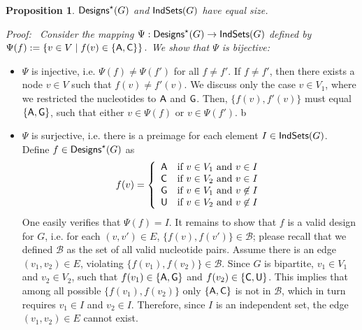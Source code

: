 \documentclass{bmcart}
\newtheorem{proposition}[theorem]{Proposition}
\newenvironment{proof}[1][]{\noindent \em Proof\ifthenelse{\equal{#1}{}}{}{ (#1)}:~}{}
\newcommand{\B}{\mathcal{B}}
\newcommand{\Design}[1]{{\sf Designs}^{\star}(#1)}
\newcommand{\IS}[1]{{\sf IndSets}(#1)}
\newcommand{\Nuc}[1]{{\sf #1}}
\newcommand{\Ab}{\Nuc{A}}
\newcommand{\Cb}{\Nuc{C}}
\newcommand{\Gb}{\Nuc{G}}
\newcommand{\Ub}{\Nuc{U}}
\begin{document}
\begin{proposition}
  $\Design{G}$ and $\IS{G}$ have equal size.
\end{proposition}
%
\begin{proof}
Consider the mapping $\Psi: \Design{G} \to \IS{G}$ defined by $ \Psi(f) := \left\{v\in V\mid f(v)\in\{\Ab,\Cb\}\right\}.$
We show that $\Psi$ is bijective:%
\begin{itemize}
\item $\Psi$ is injective, i.e. $\Psi(f)\neq\Psi(f')$ for all $f\neq f'$.
If $f\neq f'$, then there exists a node $v\in V$ such that $f(v)\neq f'(v)$.
We discuss only the case $v\in V_1$, where we restricted the nucleotides to $\Ab$ and $\Gb$. Then, $\{f(v),f'(v)\}$ must equal $\{\Ab,\Gb\}$, such that either $v\in\Psi(f)$ or $v\in\Psi(f')$.
%
b\item $\Psi$ is surjective, i.e. there is a preimage for each element $I\in \IS{G}$. Define $f\in\Design{G}$ as\begin{displaymath}
f(v) = \left\{\begin{array}{ll} %
\Ab{} & \text{if $v\in V_1$ and $v\in I$} \\ %
\Cb{} & \text{if $v\in V_2$ and $v\in I$} \\
\Gb{} & \text{if $v\in V_1$ and $v\not\in I$} \\ %
\Ub{} & \text{if $v\in V_2$ and $v\not\in I$}
\end{array}\right.
\end{displaymath}
One easily verifies that $\Psi(f) = I$.
%
%
It remains to show that $f$ is a valid design for $G$, i.e. for each $(v, v') \in E$, $\{f(v),f(v')\}\in \B$; please recall that we defined $\B$ as the set of all valid nucleotide pairs.
Assume there is an edge $(v_1,v_2)\in E$, violating $\{f(v_1),f(v_2)\} \in \B$. Since $G$ is bipartite,
$v_1\in V_1$ and $v_2\in V_2$, such that $f(v_1)\in\{\Ab,\Gb\}$ and $f(v_2)\in\{\Cb,\Ub\}$. This implies that among all possible $\{f(v_1), f(v_2)\}$ only $\{\Ab,\Cb\}$ is not in $\B$, which in turn requires $v_1\in I$ and $v_2\in I$. Therefore, since $I$ is an independent set, the edge $(v_1,v_2)\in E$ cannot exist. 
\end{itemize}
\end{proof}
\end{document}
